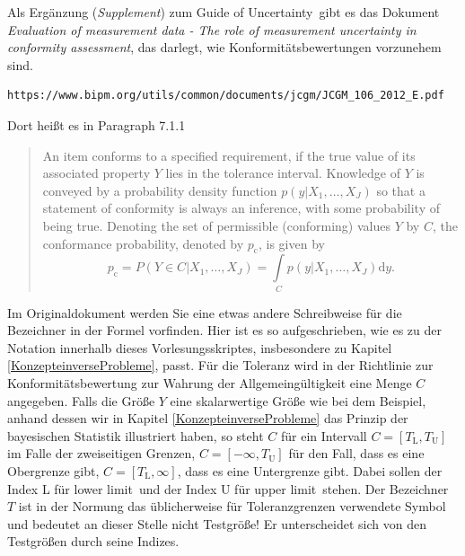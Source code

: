 Als Ergänzung (\textsl{Supplement}) zum \glqq Guide of Uncertainty\grqq ~gibt es das Dokument
\textsl{Evaluation of measurement data - The role of measurement uncertainty in conformity assessment},
das darlegt, wie Konformitätsbewertungen vorzunehem sind.
\begin{verbatim}
https://www.bipm.org/utils/common/documents/jcgm/JCGM_106_2012_E.pdf
\end{verbatim}
Dort heißt es in Paragraph 7.1.1
\begin{quote}
An item conforms to a specified requirement,
if the true value of its associated property $Y$ lies in the tolerance
interval. Knowledge of $Y$ is conveyed by a probability density function $p(y|{X_1,\dots,X_J})$
so that a statement of conformity is always an inference,
with some probability of being true. Denoting the set of permissible (conforming) values
$Y$ by $C$, the conformance probability, denoted by $p_\mathrm{c}$, is given by
\begin{equation}
	p_\mathrm{c} = P(Y \in C | {X_1,\dots,X_J}) = \int\limits_C p(y|{X_1,\dots,X_J}) \mathrm{d}y.
\end{equation}
\end{quote}
Im Originaldokument werden Sie eine etwas andere Schreibweise für die Bezeichner in der Formel vorfinden.
Hier ist es so aufgeschrieben, wie es zu der Notation innerhalb dieses Vorlesungsskriptes, insbesondere
zu Kapitel \ref{KonzepteinverseProbleme}, passt.
Für die Toleranz wird in der Richtlinie zur Konformitätsbewertung zur Wahrung der Allgemeingültigkeit
eine Menge $C$ angegeben. Falls die Größe $Y$ eine skalarwertige Größe wie bei dem Beispiel, anhand dessen
wir in Kapitel \ref{KonzepteinverseProbleme} das Prinzip der bayesischen Statistik illustriert haben,
so steht $C$ für ein Intervall $C = [T_\mathrm{L}, T_\mathrm{U}]$ im Falle der zweiseitigen
Grenzen, $C = [-\infty, T_\mathrm{U}]$ für den Fall, dass es eine Obergrenze gibt,
$C = [T_\mathrm{L}, \infty]$, dass es eine Untergrenze gibt. Dabei sollen der Index L für \glqq lower
limit\grqq ~und der Index U für \glqq upper limit\grqq ~stehen. Der Bezeichner $T$ ist in der 
Normung das üblicherweise für Toleranzgrenzen verwendete Symbol und bedeutet an dieser
Stelle nicht Testgröße! Er unterscheidet sich von den Testgrößen durch seine Indizes.

